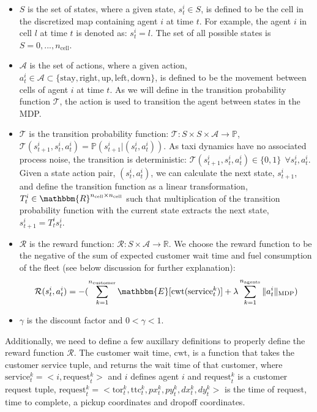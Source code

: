 \documentclass[journal]{IEEEtran}
\begin{document}
\begin{itemize}
\item $S$ is the set of states, where a given state, $s^i_t \in S$, is defined to be the cell in the discretized map containing agent $i$ at time $t$. For example, the agent $i$ in cell $l$ at time $t$ is denoted as: $s^i_t = l$. The set of all possible states is $S = {0,...,n_\text{cell}}$. 

\item $\mathcal{A}$ is the set of actions, where a given action, $a^i_t \in \mathcal{A} \subset \{ \text{stay},\text{right},\text{up},\text{left},\text{down} \}$, is defined to be the movement between cells of agent $i$ at time $t$. As we will define in the transition probability function $\mathcal{T}$, the action is used to transition the agent between states in the MDP. 

\item $\mathcal{T}$ is the transition probability function: $\mathcal{T}:S \times S \times \mathcal{A}\rightarrow \mathbb{P}$, $\mathcal{T}(s^i_{t+1},s^i_t,a^i_t) = \mathbb{P}(s^i_{t+1}|(s^i_t,a^i_t))$. As taxi dynamics have no associated process noise, the transition is deterministic: $\mathcal{T}(s^i_{t+1},s^i_t,a^i_t) \in \{0,1\} \ \ \forall s^i_t,a^i_t$. Given a state action pair, $(s^i_t,a^i_t)$, we can calculate the next state, $s^i_{t+1}$, and define the transition function as a linear transformation, $T^i_t \in \mathbbm{R}^{n_\text{cell} \times n_\text{cell}}$ such that multiplication of the transition probability function with the current state extracts the next state, $s^i_{t+1} = T^i_t s^i_t$. 
    
\item $\mathcal{R}$ is the reward function: $\mathcal{R}: S \times \mathcal{A} \rightarrow \mathbb{R}$. We choose the reward function to be the negative of the sum of expected customer wait time and fuel consumption of the fleet (see below discussion for further explanation): 
    \begin{align*}
    	\mathcal{R}(s^i_t,a^i_t) = - (
    	\sum_{k=1}^{n_\text{customer}} \mathbbm{E}[\text{cwt}( \text{service}^k_t)] + 
    	\lambda \sum_{k=1}^{n_\text{agents}} \|a^i_t\|_{\text{MDP}} )
    \end{align*}
    
\item $\gamma$ is the discount factor and $0 < \gamma < 1$.
\end{itemize}

Additionally, we need to define a few auxillary definitions to properly define the reward function $\mathcal{R}$. The customer wait time, $\text{cwt}$, is a function that takes the customer service tuple, and returns the wait time of that customer, where $\text{service}^k_t = <i,\text{request}^k_t>$ and $i$ defines agent $i$ and $\text{request}^k_t$ is a customer request tuple, $\text{request}^k_t = <\text{tor}^k_t,\text{ttc}^k_t,px^k_t,py^k_t,dx^k_t,dy^k_t>$ is the time of request, time to complete, a pickup coordinates and dropoff coordinates. 
\end{document}
